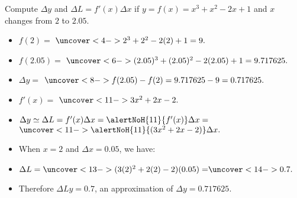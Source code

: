 \begin{frame}
\begin{example}
Compute $\Delta y$ and $\Delta L= f'(x) \Delta x$ if $y = f(x) = x^3 + x^2 - 2x + 1$ and $x$ changes from $2$ to $2.05$.
\begin{itemize}
\item<2-| alert@3-4>  $f(2) =$ $\uncover<4->{2^3+2^2-2(2)+1 = 9.}$
\item<2-| alert@5-6>  $f(2.05) =$ $\uncover<6->{(2.05)^3+(2.05)^2-2(2.05)+1 = 9.717625.}$
\item<2-| alert@7-8>  $\Delta y =$ $\uncover<8->{f(2.05) - f(2) = 9.717625 - 9 = 0.717625.}$
\item<9-| alert@10-11>  $f'(x) = $ $\uncover<11->{3x^2 + 2x -2.}$
\item<9->  $\Delta y\simeq \Delta L= f'(x)\Delta x = \alertNoH{ 11}{f'(x)}\Delta x = $ $\uncover<11->{\alertNoH{ 11}{(3x^2+2x-2)}\Delta x.}$
\item<12->  When $x = 2$ and $\Delta x = 0.05$, we have:
\item<12-| alert@13-14>  $\Delta L = \uncover<13->{(3(2)^2 + 2(2) - 2)(0.05) =} \uncover<14->{0.7.}$
\item<15->  Therefore $\Delta L y = 0.7$, an approximation of $\Delta y = 0.717625$.
\end{itemize}
\end{example}
\end{frame}

